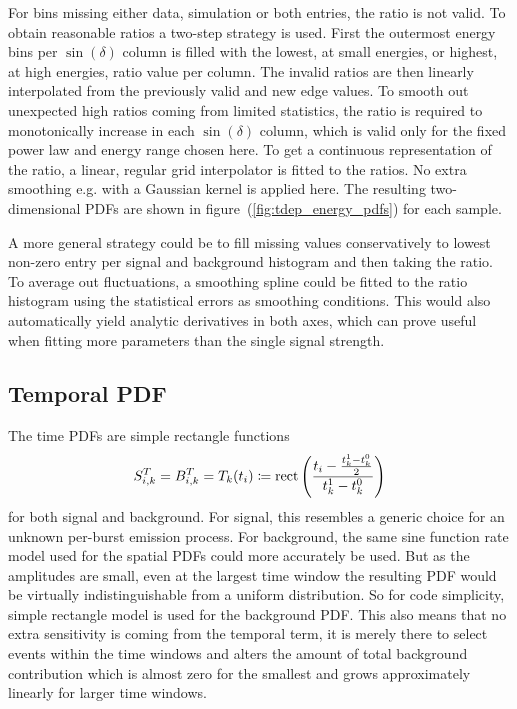 For bins missing either data, simulation or both entries, the ratio is not valid.
To obtain reasonable ratios a two-step strategy is used.
First the outermost energy bins per $\sin(\delta)$ column is filled with the lowest, at small energies, or highest, at high energies, ratio value per column.
The invalid ratios are then linearly interpolated from the previously valid and new edge values.
To smooth out unexpected high ratios coming from limited statistics, the ratio is required to monotonically increase in each $\sin(\delta)$ column, which is valid only for the fixed power law and energy range chosen here.
To get a continuous representation of the ratio, a linear, regular grid interpolator is fitted to the ratios.
No extra smoothing e.g. with a Gaussian kernel is applied here.
The resulting two-dimensional PDFs are shown in figure~(\ref{fig:tdep_energy_pdfs}) for each sample.

A more general strategy could be to fill missing values conservatively to lowest non-zero entry per signal and background histogram and then taking the ratio.
To average out fluctuations, a smoothing spline could be fitted to the ratio histogram using the statistical errors as smoothing conditions.
This would also automatically yield analytic derivatives in both axes, which can prove useful when fitting more parameters than the single signal strength.

\subsection*{Temporal PDF}
The time PDFs are simple rectangle functions
\begin{equation}
  S_{i,k}^T = B_{i,k}^T = T_k(t_i) \coloneqq
    \operatorname{rect}\left(\frac{t_i - \frac{t_k^1-t_k^0}{2}}
                              {t_k^1-t_k^0}\right)
\end{equation}
for both signal and background.
For signal, this resembles a generic choice for an unknown per-burst emission process.
For background, the same sine function rate model used for the spatial PDFs could more accurately be used.
But as the amplitudes are small, even at the largest time window the resulting PDF would be virtually indistinguishable from a uniform distribution.
So for code simplicity, simple rectangle model is used for the background PDF.
This also means that no extra sensitivity is coming from the temporal term, it is merely there to select events within the time windows and alters the amount of total background contribution which is almost zero for the smallest and grows approximately linearly for larger time windows.

